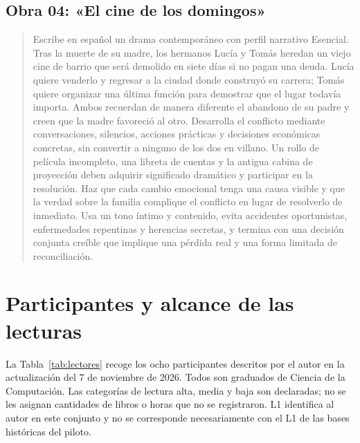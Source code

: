 \section*{Obra 04: «El cine de los domingos»}

\begin{quote}\small
Escribe en español un drama contemporáneo con perfil narrativo Esencial. Tras la muerte de su madre,
los hermanos Lucía y Tomás heredan un viejo cine de barrio que será demolido en siete días si no pagan
una deuda. Lucía quiere venderlo y regresar a la ciudad donde construyó su carrera; Tomás quiere
organizar una última función para demostrar que el lugar todavía importa. Ambos recuerdan de manera
diferente el abandono de su padre y creen que la madre favoreció al otro. Desarrolla el conflicto
mediante conversaciones, silencios, acciones prácticas y decisiones económicas concretas, sin
convertir a ninguno de los dos en villano. Un rollo de película incompleto, una libreta de cuentas y la
antigua cabina de proyección deben adquirir significado dramático y participar en la resolución. Haz
que cada cambio emocional tenga una causa visible y que la verdad sobre la familia complique el
conflicto en lugar de resolverlo de inmediato. Usa un tono íntimo y contenido, evita accidentes
oportunistas, enfermedades repentinas y herencias secretas, y termina con una decisión conjunta creíble
que implique una pérdida real y una forma limitada de reconciliación.
\end{quote}

\chapter{Participantes y alcance de las lecturas}\label{app:lectores}

La Tabla~\ref{tab:lectores} recoge los ocho participantes descritos por el autor en la actualización
del 7 de noviembre de 2026. Todos son graduados de Ciencia de la Computación. Las categorías de
lectura alta, media y baja son declaradas; no se les asignan cantidades de libros o horas que no
se registraron. L1 identifica al autor en este conjunto y no se corresponde necesariamente con el
L1 de las bases históricas del piloto.

\begin{table}[htb]
  \centering
  \caption{Perfiles anónimos del estudio (octubre--1 de noviembre de 2026)}
  \label{tab:lectores}
  \small
  
\end{table}

